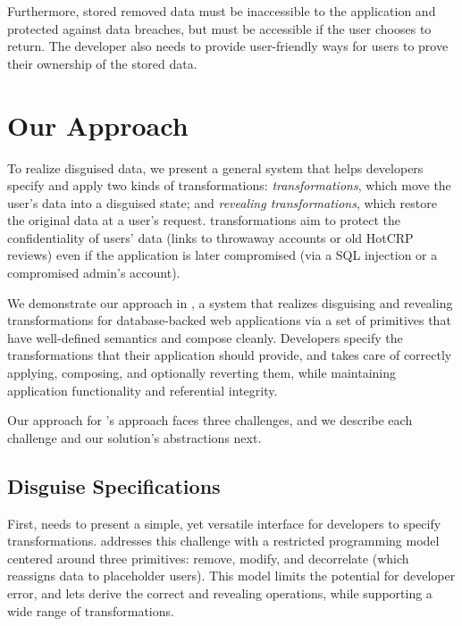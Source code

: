 %
Furthermore, stored removed data must be inaccessible to the application and
protected against data breaches, but must be accessible if the user chooses to
return. The developer also needs to provide user-friendly ways for users to
prove their ownership of the stored data.
%


\section{Our Approach}
%
To realize disguised data, we present a general system that helps developers
specify and apply two kinds of transformations: \emph{\xxing transformations},
which move the user's data into a disguised state; and \emph{revealing
transformations}, which restore the original data at a user’s request.
%
\Xxing transformations aim to protect the confidentiality of users' \xxed data
(\eg links to throwaway accounts or old HotCRP reviews) even if the application
is later compromised (\eg via a SQL injection or a compromised admin's account).
%

%
We demonstrate our approach in \sys, a system that realizes disguising and
revealing transformations for database-backed web applications via a set of
primitives that have well-defined semantics and compose cleanly.
%
Developers specify the transformations that their application should provide,
and \sys takes care of correctly applying, composing, and optionally reverting
them, while maintaining application functionality and referential integrity.
%

%
%
Our approach for \sys's approach faces three challenges, and we describe each
challenge and our solution's abstractions next.

\subsection{Disguise Specifications}
%
First, \sys needs to present a simple, yet versatile interface for developers to
specify \xxing transformations.
%
\sys addresses this challenge with a restricted programming model centered
around three primitives: remove, modify, and decorrelate (which reassigns data
to placeholder users).
%
This model limits the potential for developer error, and lets \sys derive the
correct \xxing and revealing operations, while supporting a wide range of
transformations.
%

